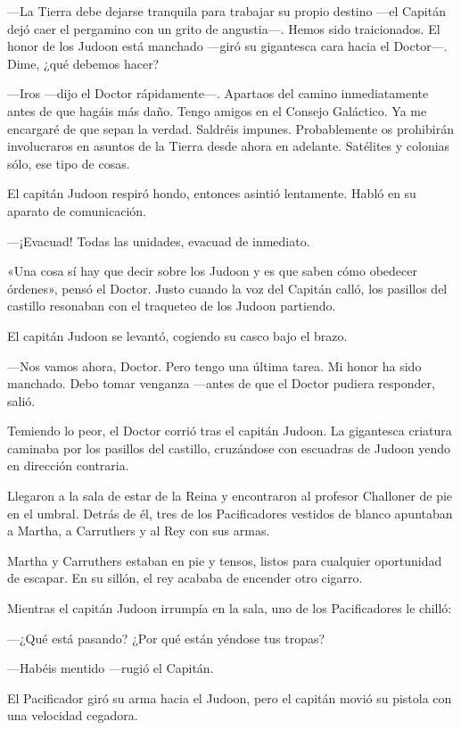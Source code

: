 ---La Tierra debe dejarse tranquila para trabajar su propio destino
---el Capitán dejó caer el pergamino con un grito de angustia---. Hemos
sido traicionados. El honor de los Judoon está manchado ---giró su
gigantesca cara hacia el Doctor---. Dime, ¿qué debemos hacer?

---Iros ---dijo el Doctor rápidamente---. Apartaos del camino
inmediatamente antes de que hagáis más daño. Tengo amigos en el Consejo
Galáctico. Ya me encargaré de que sepan la verdad. Saldréis impunes.
Probablemente os prohibirán involucraros en asuntos de la Tierra desde
ahora en adelante. Satélites y colonias sólo, ese tipo de cosas.

El capitán Judoon respiró hondo, entonces asintió lentamente. Habló en
su aparato de comunicación.

---¡Evacuad! Todas las unidades, evacuad de inmediato.

«Una cosa sí hay que decir sobre los Judoon y es que saben cómo obedecer
órdenes», pensó el Doctor. Justo cuando la voz del Capitán calló, los
pasillos del castillo resonaban con el traqueteo de los Judoon
partiendo.

El capitán Judoon se levantó, cogiendo su casco bajo el brazo.

---Nos vamos ahora, Doctor. Pero tengo una última tarea. Mi honor ha
sido manchado. Debo tomar venganza ---antes de que el Doctor pudiera
responder, salió.

Temiendo lo peor, el Doctor corrió tras el capitán Judoon. La gigantesca
criatura caminaba por los pasillos del castillo, cruzándose con
escuadras de Judoon yendo en dirección contraria.

Llegaron a la sala de estar de la Reina y encontraron al profesor
Challoner de pie en el umbral. Detrás de él, tres de los Pacificadores
vestidos de blanco apuntaban a Martha, a Carruthers y al Rey con sus
armas.

Martha y Carruthers estaban en pie y tensos, listos para cualquier
oportunidad de escapar. En su sillón, el rey acababa de encender otro
cigarro.

Mientras el capitán Judoon irrumpía en la sala, uno de los Pacificadores
le chilló:

---¿Qué está pasando? ¿Por qué están yéndose tus tropas?

---Habéis mentido ---rugió el Capitán.

El Pacificador giró su arma hacia el Judoon, pero el capitán movió su
pistola con una velocidad cegadora.

